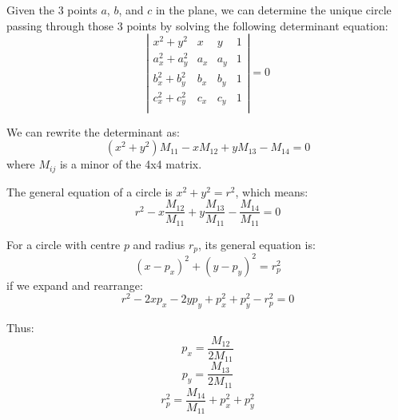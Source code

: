 Given the 3 points $a$, $b$, and $c$ in the plane, we can determine the unique circle passing through those 3 points by solving the following determinant equation:
\begin{equation}
  \left| 
  \begin{array}{cccc}
    x^2 + y^2 & x & y & 1 \\
    a_x^2 + a_y^2 & a_x & a_y & 1 \\
    b_x^2 + b_y^2 & b_x & b_y & 1 \\
    c_x^2 + c_y^2 & c_x & c_y & 1 \\
  \end{array} 
  \right| 
  = 0
\end{equation}

We can rewrite the determinant as:
\begin{equation}
  (x^2 + y^2)M_{11} - xM_{12} + yM_{13} - M_{14} = 0
\end{equation}
where $M_{ij}$ is a minor of the 4x4 matrix.

The general equation of a circle is $x^2 + y^2 = r^2$, which means:
\begin{equation}
  r^2 - x\frac{M_{12}}{M_{11}} + y\frac{M_{13}}{M_{11}} - \frac{M_{14}}{M_{11}} = 0
\end{equation}

For a circle with centre $p$ and radius $r_p$, its general equation is:
\begin{equation}
  (x - p_x)^2 + (y - p_y)^2 = r_p^2
\end{equation}
if we expand and rearrange:
\begin{equation}
  r^2 - 2xp_x - 2yp_y + p_x^2 + p_y^2 -r_p^2 = 0
\end{equation}

Thus:
\begin{equation}
  p_x = \frac{M_{12}}{2M_{11}}
\end{equation}
\begin{equation}
  p_y = \frac{M_{13}}{2M_{11}}
\end{equation}
\begin{equation}
  r_p^2 = \frac{M_{14}}{M_{11}} + p_x^2 + p_y^2
\end{equation}